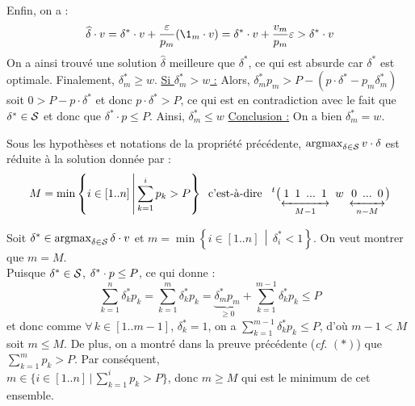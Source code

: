 \begin{Preuve}
				Enfin, on a :
					\[
						\widehat{\delta} \cdot v = \delta^* \cdot v + \frac{\varepsilon}{p_m}(\1_m \cdot v) = \delta^* \cdot v + \frac{v_m}{p_m}\varepsilon > \delta^* \cdot v
					\]
				On a ainsi trouvé une solution \(\widehat{\delta}\) meilleure que \(\delta^*\), ce qui est absurde car \(\delta^*\) est optimale. Finalement, \(\delta^*_m \geq w\). \nt
				\underline{\bdot Si \(\delta^*_m > w\) :} Alors, \(\delta^*_mp_m > P - (p\cdot \delta^* - p_m\delta^*_m)\) soit \(0 > P - p\cdot \delta^*\) et donc \(p\cdot \delta^* > P\), ce qui est en contradiction avec le fait que \(\delta^* \in \cal{S}\) et donc que \(\delta^* \cdot p \leq P\). Ainsi, \(\delta^*_m \leq w\) \nt
				\underline{Conclusion :} On a bien \(\delta^*_m = w\).
			\end{Preuve}
		
		\eqskip{3mm}
		\begin{Corollaire}
			Sous les hypothèses et notations de la propriété précédente, \( \argmax_{\delta\in\cal{S}} v \dotp \delta \) est réduite à la solution donnée par :
				\[
					M = \min \left\{ i \in [1..n] \, \middle| \, \sum_{k=1}^{i} p_k > P \right\} \!\! \hspace{3mm} \text{c'est-à-dire} \hspace{3mm} ^t \big(\underset{\underset{\scriptstyle{M-1}}{\textstyle \xleftrightarrow{\hspace*{13mm}}}}{1 \ \, 1 \ \, ... \ \, 1} \ \, w \ \, \underset{\underset{\scriptstyle n-M}{\xleftrightarrow{\hspace*{9mm}}}}{0 \ \, ... \ \, 0} \big)
				\]
		\end{Corollaire}
		
		\eqskip{2mm}
		\begin{Preuve}
			Soit \( \delta^* \in \argmax_{\delta \in \cal{S}} \delta \dotp v \) et \( m = \min \left\{ i \in [1..n] \, \middle| \, \delta^*_i < 1 \right\}\). On veut montrer que \( m = M \). \\
			Puisque \( \delta^* \in \cal{S} \), \( \delta^* \dotp p \leq P \), ce qui donne :
			\[
				\displaystyle \sum_{k=1}^n \delta^*_k p_k = \sum_{k=1}^{m} \delta^*_k p_k = \underbrace{\delta^*_m p_m}_{\geq 0} + \sum_{k=1}^{m-1} \delta^*_k p_k \leq P
			\]
			et donc comme \(\forall\,k\in[1..m-1]\), \(\delta^*_k = 1\), on a \(\displaystyle \sum\nolimits_{k=1}^{m-1} {\delta^*_k} p_k \leq P\), d'où \(m-1 < M\) soit \(m \leq M\). \nt
			De plus, on a montré dans la preuve précédente (\emph{cf.} $\bm{(*)}$) que \( \displaystyle \sum\nolimits_{k=1}^{m} p_k > P \). Par conséquent, \\[-1mm] \( \displaystyle m \in \big\{ i \in [1..n] \, \big| \, \sum\nolimits_{k=1}^i p_k > P \big\} \), donc \( m \geq M \) qui est le minimum de cet ensemble.
		\end{Preuve}
		
